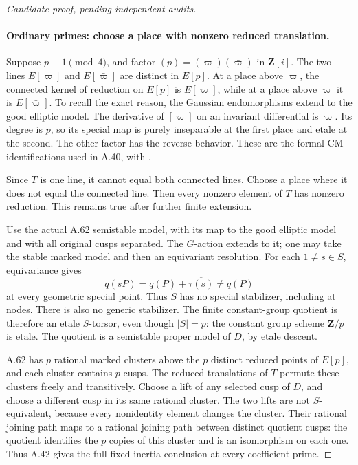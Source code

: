 \begin{proof}[Candidate proof, pending independent audits]
\paragraph{Ordinary primes: choose a place with nonzero reduced translation.}
Suppose \(p\equiv1\pmod4\), and factor
\((p)=(\varpi)(\bar\varpi)\) in
\(\mathbf Z[i]\). The two lines
\(E[\varpi]\) and \(E[\bar\varpi]\)
are distinct in \(E[p]\). At a place above
\(\varpi\), the connected kernel of reduction
on \(E[p]\) is \(E[\varpi]\), while at a
place above \(\bar\varpi\) it is
\(E[\bar\varpi]\). To recall the exact
reason, the Gaussian endomorphisms extend to
the good elliptic model. The derivative of
\([\varpi]\) on an invariant differential is
\(\varpi\). Its degree is \(p\), so its
special map is purely inseparable at the first
place and etale at the second. The other factor
has the reverse behavior. These are the formal
CM identifications used in A.40, with
\cite[Theorem III.6.2 and Theorem V.3.1]{fghSilvermanAEC}.

Since \(T\) is one line, it cannot equal both
connected lines. Choose a place where it does
not equal the connected line. Then every
nonzero element of \(T\) has nonzero reduction.
This remains true after further finite extension.

Use the actual A.62 semistable model, with its
map to the good elliptic model and with all
original cusps separated. The \(G\)-action
extends to it; one may take the stable marked
model and then an equivariant resolution. For
each \(1\ne s\in S\), equivariance gives
\[
       \bar q(sP)=\bar q(P)+\overline{\tau(s)}
                         \ne\bar q(P)                \tag{A.65.4}
\]
at every geometric special point. Thus \(S\)
has no special stabilizer, including at nodes.
There is also no generic stabilizer. The finite
constant-group quotient is therefore an etale
\(S\)-torsor, even though \(|S|=p\): the
constant group scheme \(\mathbf Z/p\) is etale.
The quotient is a semistable proper model of
\(D\), by etale descent.

A.62 has \(p\) rational marked clusters above
the \(p\) distinct reduced points of \(E[p]\),
and each cluster contains \(p\) cusps. The
reduced translations of \(T\) permute these
clusters freely and transitively. Choose a lift
of any selected cusp of \(D\), and choose a
different cusp in its same rational cluster.
The two lifts are not \(S\)-equivalent, because
every nonidentity element changes the cluster.
Their rational joining path maps to a rational
joining path between distinct quotient cusps:
the quotient identifies the \(p\) copies of
this cluster and is an isomorphism on each one.
Thus A.42 gives the full fixed-inertia conclusion
at every coefficient prime.


\end{proof}
